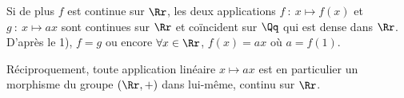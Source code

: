 {\begin{enumerate}
{Si de plus $f$ est continue sur $\Rr$, les deux applications $f~:~x\mapsto f(x)$ et $g~:~x\mapsto ax$ sont continues sur $\Rr$ et coïncident sur $\Qq$ qui est dense dans $\Rr$. D'après le 1), $f = g$ ou encore $\forall x\in\Rr$, $f(x)=ax$ où $a=f(1)$.

Réciproquement, toute application linéaire $x\mapsto ax$ est en particulier un morphisme du groupe $(\Rr,+)$ dans lui-même, continu sur $\Rr$. 

\begin{center}
\end{center}}
\end{enumerate}
}
